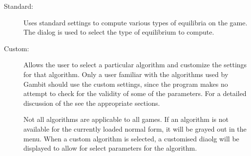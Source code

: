 \documentclass[12pt]{report}
\begin{document}
\begin{description}
\item[Standard:] Uses standard settings to compute various types of
equilibria on the game.  The  dialog is used to select the type of
equilibrium to compute.
\item[Custom:] Allows the user to select a particular algorithm and
customize the settings for that algorithm.  Only a user familiar with
the algorithms used by Gambit should use the custom settings, since
the program makes no attempt to check for the validity of some of the
parameters.  For a detailed discussion of the 
 see the appropriate sections.

Not all algorithms are applicable to all games.  If an algorithm is
not available for the currently loaded normal form, it will be grayed
out in the menu.  When a custom algorithm is selected, a customised
 diaolg will be
displayed to allow for select parameters for the algorithm.  


\end{description}
\end{document}
